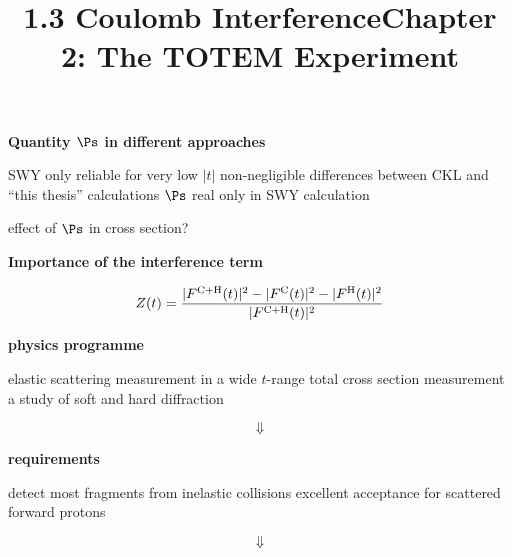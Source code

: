 \vfil
\centerline{\bf Quantity $\Ps$ in different approaches}
\vskip3mm

\centerline{}

\> SWY only reliable for very low $|t|$
\> non-negligible differences between CKL and ``this thesis'' calculations
\> $\Ps$ real only in SWY calculation

\newpage%
\title{1.3 Coulomb Interference}

\vskip-3mm

\> effect of $\Ps$ in cross section?

\vfil

\centerline{\bf Importance of the interference term}

$$Z(t) = {|F^{\rm C+H}(t)|^2 - |F^{\rm C}(t)|^2 - |F^{\rm H}(t)|^2\over |F^{\rm C+H}(t)|^2}$$

\vskip2mm
{

}




\newpage%
\title{Chapter 2: The TOTEM Experiment}


\centerline{\bf physics programme}
\vskip1mm
\> elastic scattering measurement in a wide $t$-range
\> total cross section measurement
\> a study of soft and hard diffraction

\vfil
\vskip-5mm
$$\Downarrow$$
\vfil

\centerline{\bf requirements}
\vskip1mm
\> detect most fragments from inelastic collisions
\> excellent acceptance for scattered forward protons

\vfil
\vskip-3mm
$$\Downarrow$$
\vfil


